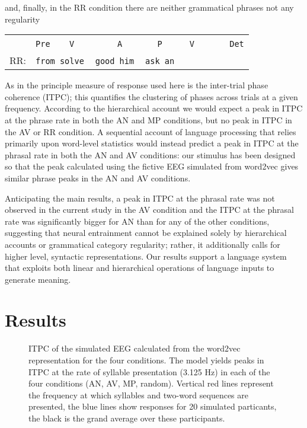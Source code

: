 \documentclass[10pt,letterpaper]{article}
\newcommand{\tts}{%
  \texttt{\,}
}
\begin{document}
and, finally, in the RR condition there are neither grammatical phrases not any regularity
\begin{center}
  \begin{tabular}{cl}
   &\texttt{Pre}\tts{}\tts{}\texttt{V}\tts\tts\tts{}\tts{}\tts{}\texttt{A}\tts{}\tts\tts{}\tts{}\texttt{P}\tts{}\tts{}\tts{}\texttt{V}\tts\tts\tts\tts{}\texttt{Det}\\ 
RR:&\texttt{from solve}\tts\texttt{good him}{}\tts\texttt{ask an}
\end{tabular}
\end{center}

As in \cite{DingEtAl2017} the principle measure of response used here
is the inter-trial phase coherence (ITPC); this quantifies the
clustering of phases across trials at a given frequency. According to
the hierarchical account we would expect a peak in ITPC at the phrase
rate in both the AN and MP conditions, but no peak in ITPC in the AV
or RR condition. A sequential account of language processing that
relies primarily upon word-level statistics would instead predict a
peak in ITPC at the phrasal rate in both the AN and AV conditions: our
stimulus has been designed so that the peak calculated using the
fictive EEG simulated from word2vec gives similar phrase peaks in the
AN and AV conditions.

Anticipating the main results, a peak in ITPC at the phrasal rate was
not observed in the current study in the AV condition and the ITPC at
the phrasal rate was significantly bigger for AN than for any of the
other conditions, suggesting that neural entrainment cannot be
explained solely by hierarchical accounts or grammatical category
regularity; rather, it additionally calls for higher level, syntactic
representations. Our results support a language system that exploits
both linear and hierarchical operations of language inputs to generate
meaning.


\section*{Results}

\begin{figure}[tbhp]

\caption{ITPC of the simulated EEG calculated from the word2vec
  representation for the four conditions. The model yields peaks in
  ITPC at the rate of syllable presentation (3.125 Hz) in each of the
  four conditions (AN, AV, MP, random). Vertical red lines represent
  the frequency at which syllables and two-word sequences are
  presented, the blue lines show responses for 20 simulated
  particants, the black is the grand average over these participants.
}
\label{fig:Fig1}
\end{figure}
\end{document}
